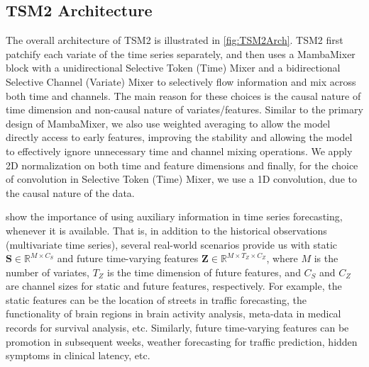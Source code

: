 \documentclass{article}
\newcommand{\R}[0]{\mathbb{R}}
\newcommand{\head}[1]{\vspace{1.7mm}\noindent{{\textcolor{c1}{\bf #1.}}}}
\begin{document}
\subsection{TSM2 Architecture}
The overall architecture of TSM2 is illustrated in \autoref{fig:TSM2Arch}. TSM2 first patchify each variate of the time series separately, and then uses a MambaMixer block with a unidirectional Selective Token (Time) Mixer and a bidirectional Selective Channel (Variate) Mixer to selectively flow information and mix across both time and channels. The main reason for these choices is the causal nature of time dimension and non-causal nature of variates/features. Similar to the primary design of MambaMixer, we also use weighted averaging to allow the model directly access to early features, improving the stability and allowing the model to effectively ignore unnecessary time and channel mixing operations. We apply 2D normalization on both time and feature dimensions and finally, for the choice of convolution in Selective Token (Time) Mixer, we use a 1D convolution, due to the causal nature of the data. 

\head{Auxiliary Information}
\citet{chen2023tsmixer} show the importance of using auxiliary information in time series forecasting, whenever it is available. That is, in addition to the historical observations (multivariate time series), several real-world scenarios provide us with static $\mathbf{S} \in \R^{M \times C_S}$ and future time-varying features $\mathbf{Z} \in \R^{M \times T_Z \times C_Z}$, where $M$ is the number of variates, $T_Z$ is the time dimension of future features, and $C_S$ and $C_Z$ are channel sizes for static and future features, respectively. For example, the static features can be the location of streets in traffic forecasting, the functionality of brain regions in brain activity analysis, meta-data in medical records for survival analysis, etc. Similarly, future time-varying features can be promotion in subsequent weeks, weather forecasting for traffic prediction, hidden symptoms in clinical latency, etc.  
\end{document}
